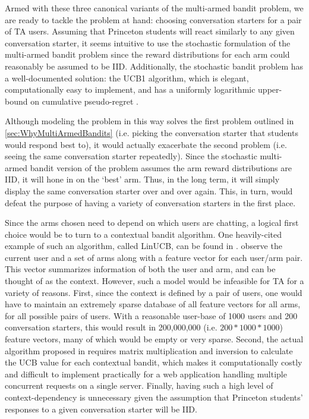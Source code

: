 Armed with these three canonical variants of the multi-armed bandit problem, we are ready to tackle the problem at hand: choosing conversation starters for a pair of TA users. Assuming that Princeton students will react similarly to any given conversation starter, it seems intuitive to use the stochastic formulation of the multi-armed bandit problem since the reward distributions for each arm could reasonably be assumed to be IID. Additionally, the stochastic bandit problem has a well-documented solution: the UCB1 algorithm, which is elegant, computationally easy to implement, and has a uniformly logarithmic upper-bound on cumulative pseudo-regret \citep{auer02}.

Although modeling the problem in this way solves the first problem outlined in \autoref{sec:WhyMultiArmedBandits} (i.e. picking the conversation starter that students would respond best to), it would actually exacerbate the second problem (i.e. seeing the same conversation starter repeatedly). Since the stochastic multi-armed bandit version of the problem assumes the arm reward distributions are IID, it will hone in on the `best' arm. Thus, in the long term, it will simply display the same conversation starter over and over again. This, in turn, would defeat the purpose of having a variety of conversation starters in the first place.

Since the arms chosen need to depend on which users are chatting, a logical first choice would be to turn to a contextual bandit algorithm. One heavily-cited example of such an algorithm, called LinUCB, can be found in \cite{chu10}. \cite{chu10} observe the current user and a set of arms along with a feature vector for each user/arm pair. This vector summarizes information of both the user and arm, and can be thought of as the context. However, such a model would be infeasible for TA for a variety of reasons. First, since the context is defined by a pair of users, one would have to maintain an extremely sparse database of all feature vectors for all arms, for all possible pairs of users. With a reasonable user-base of 1000 users and 200 conversation starters, this would result in 200,000,000 (i.e. $200 * 1000 * 1000$) feature vectors, many of which would be empty or very sparse. Second, the actual algorithm proposed in \cite{chu10} requires matrix multiplication and inversion to calculate the UCB value for each contextual bandit, which makes it computationally costly and difficult to implement practically for a web application handling multiple concurrent requests on a single server. Finally, having such a high level of context-dependency is unnecessary given the assumption that Princeton students' responses to a given conversation starter will be IID.

